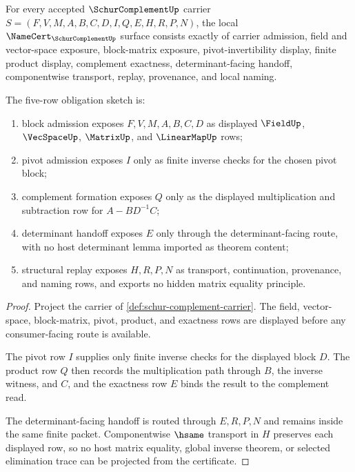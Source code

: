 \begin{theorem}
\label{thm:schur-complement-namecert-obligations}
For every accepted $\SchurComplementUp$ carrier $S=(F,V,M,A,B,C,D,I,Q,E,H,R,P,N)$, the local $\NameCert_{\SchurComplementUp}$ surface consists exactly of carrier admission, field and vector-space exposure, block-matrix exposure, pivot-invertibility display, finite product display, complement exactness, determinant-facing handoff, componentwise transport, replay, provenance, and local naming.

The five-row obligation sketch is:
\begin{enumerate}
\item block admission exposes $F,V,M,A,B,C,D$ as displayed $\FieldUp$, $\VecSpaceUp$, $\MatrixUp$, and $\LinearMapUp$ rows;
\item pivot admission exposes $I$ only as finite inverse checks for the chosen pivot block;
\item complement formation exposes $Q$ only as the displayed multiplication and subtraction row for $A-BD^{-1}C$;
\item determinant handoff exposes $E$ only through the determinant-facing route, with no host determinant lemma imported as theorem content;
\item structural replay exposes $H,R,P,N$ as transport, continuation, provenance, and naming rows, and exports no hidden matrix equality principle.
\end{enumerate}
\end{theorem}
\begin{proof}
Project the carrier of \autoref{def:schur-complement-carrier}. The field, vector-space, block-matrix, pivot, product, and exactness rows are displayed before any consumer-facing route is available.

The pivot row $I$ supplies only finite inverse checks for the displayed block $D$. The product row $Q$ then records the multiplication path through $B$, the inverse witness, and $C$, and the exactness row $E$ binds the result to the complement read.

The determinant-facing handoff is routed through $E,R,P,N$ and remains inside the same finite packet. Componentwise $\hsame$ transport in $H$ preserves each displayed row, so no host matrix equality, global inverse theorem, or selected elimination trace can be projected from the certificate.
\end{proof}

